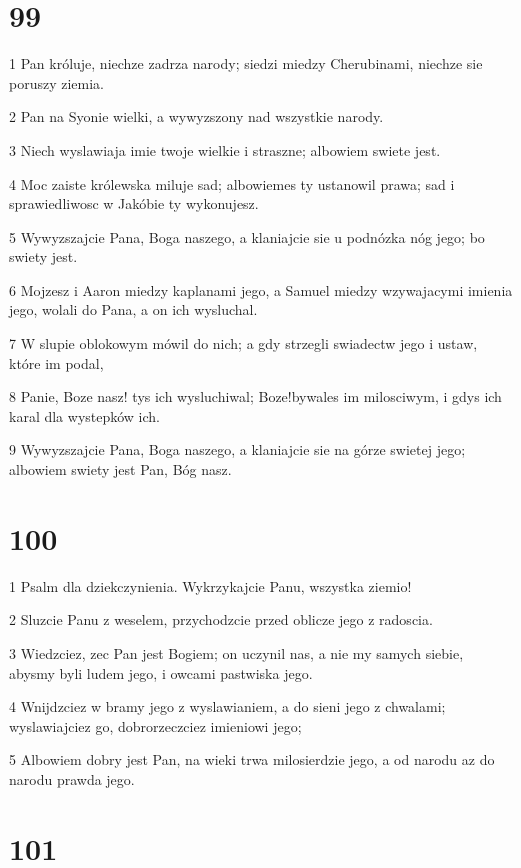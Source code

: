 \chapter{99}

\par 1 Pan króluje, niechze zadrza narody; siedzi miedzy Cherubinami, niechze sie poruszy ziemia.
\par 2 Pan na Syonie wielki, a wywyzszony nad wszystkie narody.
\par 3 Niech wyslawiaja imie twoje wielkie i straszne; albowiem swiete jest.
\par 4 Moc zaiste królewska miluje sad; albowiemes ty ustanowil prawa; sad i sprawiedliwosc w Jakóbie ty wykonujesz.
\par 5 Wywyzszajcie Pana, Boga naszego, a klaniajcie sie u podnózka nóg jego; bo swiety jest.
\par 6 Mojzesz i Aaron miedzy kaplanami jego, a Samuel miedzy wzywajacymi imienia jego, wolali do Pana, a on ich wysluchal.
\par 7 W slupie oblokowym mówil do nich; a gdy strzegli swiadectw jego i ustaw, które im podal,
\par 8 Panie, Boze nasz! tys ich wysluchiwal; Boze!bywales im milosciwym, i gdys ich karal dla wystepków ich.
\par 9 Wywyzszajcie Pana, Boga naszego, a klaniajcie sie na górze swietej jego; albowiem swiety jest Pan, Bóg nasz.

\chapter{100}

\par 1 Psalm dla dziekczynienia. Wykrzykajcie Panu, wszystka ziemio!
\par 2 Sluzcie Panu z weselem, przychodzcie przed oblicze jego z radoscia.
\par 3 Wiedzciez, zec Pan jest Bogiem; on uczynil nas, a nie my samych siebie, abysmy byli ludem jego, i owcami pastwiska jego.
\par 4 Wnijdzciez w bramy jego z wyslawianiem, a do sieni jego z chwalami; wyslawiajciez go, dobrorzeczciez imieniowi jego;
\par 5 Albowiem dobry jest Pan, na wieki trwa milosierdzie jego, a od narodu az do narodu prawda jego.

\chapter{101}

